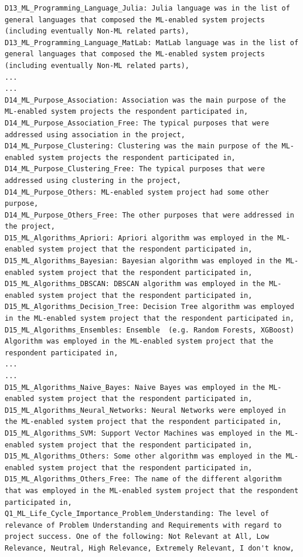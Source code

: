 \begin{verbatim}
D13_ML_Programming_Language_Julia: Julia language was in the list of general languages that composed the ML-enabled system projects (including eventually Non-ML related parts),
D13_ML_Programming_Language_MatLab: MatLab language was in the list of general languages that composed the ML-enabled system projects (including eventually Non-ML related parts),
...
...
D14_ML_Purpose_Association: Association was the main purpose of the ML-enabled system projects the respondent participated in,
D14_ML_Purpose_Association_Free: The typical purposes that were addressed using association in the project,
D14_ML_Purpose_Clustering: Clustering was the main purpose of the ML-enabled system projects the respondent participated in,
D14_ML_Purpose_Clustering_Free: The typical purposes that were addressed using clustering in the project,
D14_ML_Purpose_Others: ML-enabled system project had some other purpose,
D14_ML_Purpose_Others_Free: The other purposes that were addressed in the project,
D15_ML_Algorithms_Apriori: Apriori algorithm was employed in the ML-enabled system project that the respondent participated in,
D15_ML_Algorithms_Bayesian: Bayesian algorithm was employed in the ML-enabled system project that the respondent participated in,
D15_ML_Algorithms_DBSCAN: DBSCAN algorithm was employed in the ML-enabled system project that the respondent participated in,
D15_ML_Algorithms_Decision_Tree: Decision Tree algorithm was employed in the ML-enabled system project that the respondent participated in,
D15_ML_Algorithms_Ensembles: Ensemble  (e.g. Random Forests, XGBoost) Algorithm was employed in the ML-enabled system project that the respondent participated in,
...
...
D15_ML_Algorithms_Naive_Bayes: Naive Bayes was employed in the ML-enabled system project that the respondent participated in,
D15_ML_Algorithms_Neural_Networks: Neural Networks were employed in the ML-enabled system project that the respondent participated in,
D15_ML_Algorithms_SVM: Support Vector Machines was employed in the ML-enabled system project that the respondent participated in,
D15_ML_Algorithms_Others: Some other algorithm was employed in the ML-enabled system project that the respondent participated in,
D15_ML_Algorithms_Others_Free: The name of the different algorithm that was employed in the ML-enabled system project that the respondent participated in,
Q1_ML_Life_Cycle_Importance_Problem_Understanding: The level of relevance of Problem Understanding and Requirements with regard to project success. One of the following: Not Relevant at All, Low Relevance, Neutral, High Relevance, Extremely Relevant, I don't know,

\end{verbatim}

